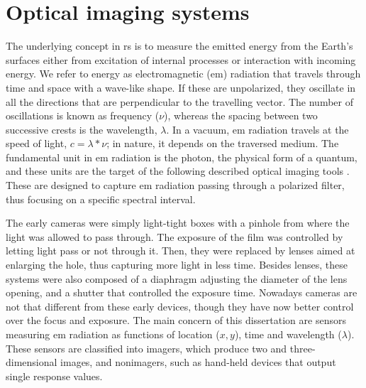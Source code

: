 \section{Optical imaging systems} 

The underlying concept in \acrshort{rs} is to measure the emitted energy from the Earth's surfaces either from excitation of internal processes or interaction with incoming energy. We refer to energy as electromagnetic (\acrshort{em}) radiation that travels through time and space with a wave-like shape. If these are unpolarized, they oscillate in all the directions that are perpendicular to the travelling vector. The number of oscillations is known as frequency ($\nu$), whereas the spacing between two successive crests is the wavelength, $\lambda$. In a vacuum, \acrshort{em} radiation travels at the speed of light, $c = \lambda * \nu$; in nature, it depends on the traversed medium. The fundamental unit in \acrshort{em} radiation is the photon, the physical form of a quantum, and these units are the target of the following described optical imaging tools \cite{emery_introduction_2017}. These are designed to capture \acrshort{em} radiation passing through a polarized filter, thus focusing on a specific spectral interval.

The early cameras were simply light-tight boxes with a pinhole from where the light was allowed to pass through. The exposure of the film was controlled by letting light pass or not through it. Then, they were replaced by lenses aimed at enlarging the hole, thus capturing more light in less time. Besides lenses, these systems were also composed of a diaphragm adjusting the diameter of the lens opening, and a shutter that controlled the exposure time. Nowadays cameras are not that different from these early devices, though they have now better control over the focus and exposure. The main concern of this dissertation are sensors measuring \acrshort{em} radiation as functions of location ($x, y$), time and wavelength ($\lambda$). These sensors are classified into imagers, which produce two and three-dimensional images, and nonimagers, such as hand-held devices that output single response values. 

